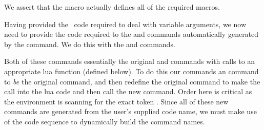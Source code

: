 \startMkIVCode
\unexpanded{}

\def\defineLitProgsDirect{%
  \ifthirdargument%
    \expandafter\defineLitProgsTriple%
  \else\ifsecondargument%
    \expandafter\defineLitProgsDouble%
  \else\iffirstargument%
    \expandafter\defineLitProgsSingle%
  \else%
    \expandafter\defineLitProgsZero%
  \fi\fi\fi%
}

\def\defineLitProgsTriple[#1][#2][#3]{
  \definetyping[#1][#2][#3]
  \fixStartLitProgs{#1}
  \fixStopLitProgs{#1}
  \defineLitProgsCreateFile{#1}
}

\def\defineLitProgsDouble[#1][#2]{
  \definetyping[#1][#2]
  \fixStartLitProgs{#1}
  \fixStopLitProgs{#1}
  \defineLitProgsCreateFile{#1}
}

\def\defineLitProgsSingle[#1]{
  \definetyping[#1]
  \fixStartLitProgs{#1}
  \fixStopLitProgs{#1}
  \defineLitProgsCreateFile{#1}
}

\def\defineLitProgsZero{
  \errmessage{
    \string\\defineLitProgs
    requires at least one argument,
    you have provided none.
  }
}
\stopMkIVCode


We assert that the  macro actually defines all of 
the required macros. 

\startConTest
\startMocking

\stopMocking
\stopConTest

\stopTestCase

\stopTestSuite

Having provided the \ConTeXt\ code required to deal with variable 
arguments, we now need to provide the code required to  the 
\type{\startXXX} and \type{\stopXXX} commands automatically generated by 
the  command. We do this with the 
\type{\fixStartLitProgs} and \type{\fixStopLitProgs} commands. 

Both of these commands essentially  the original 
\type{\startXXX} and \type{\stopXXX} commands with calls to an appropriate 
lua function (defined below). To do this our  commands 
\type{\let} an \type{\oldXXX} command to \emph{be} the original command, 
and then redefine the original command to make the call into the lua code 
and then call the new \type{\oldXXX} command. Order here is critical as 
the  environment is scanning for the exact token 
\type{\stopXXX}. Since all of these new commands are generated from the 
user's supplied code name, we must make use of the 
\type{\csname\endcsname} code sequence to dynamically build the command 
names. 

